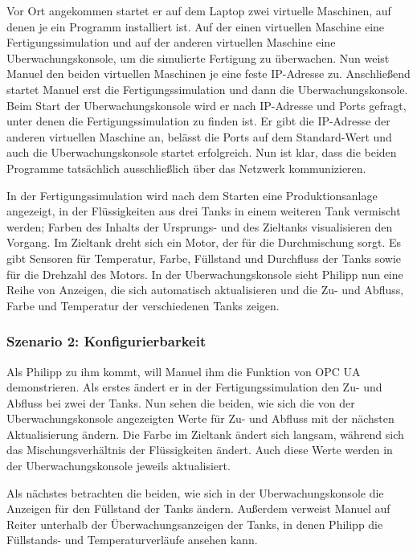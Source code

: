 \documentclass[parskip=full]{scrartcl}
\begin{document}
Vor Ort angekommen startet er auf dem Laptop zwei virtuelle Maschinen, auf denen je ein Programm installiert ist.
Auf der einen virtuellen Maschine eine \gls{Fertigungssimulation} und auf der anderen virtuellen Maschine
eine \gls{Uberwachungskonsole}, um die simulierte Fertigung zu überwachen.
Nun weist Manuel den beiden virtuellen Maschinen je eine feste IP-Adresse zu.
Anschlie{\ss}end startet Manuel erst die \gls{Fertigungssimulation} und dann die \gls{Uberwachungskonsole}.
Beim Start der \gls{Uberwachungskonsole} wird er nach \gls{IP-Adresse} und Ports gefragt, unter denen die \gls{Fertigungssimulation} zu finden ist.
Er gibt die \gls{IP-Adresse} der anderen virtuellen Maschine an, belässt die Ports auf dem Standard-Wert
und auch die \gls{Uberwachungskonsole} startet erfolgreich.
Nun ist klar, dass die beiden Programme tatsächlich ausschließlich über das Netzwerk kommunizieren.

In der \gls{Fertigungssimulation} wird nach dem Starten eine \gls{Produktionsanlage} angezeigt, in der Flüssigkeiten aus drei Tanks
in einem weiteren Tank vermischt werden; Farben des Inhalts der Ursprungs- und des Zieltanks visualisieren den Vorgang.
Im Zieltank dreht sich ein Motor, der für die Durchmischung sorgt.
Es gibt Sensoren für Temperatur, Farbe, Füllstand und Durchfluss der Tanks sowie für die Drehzahl des Motors.
In der \gls{Uberwachungskonsole} sieht Philipp nun eine Reihe von Anzeigen, die sich automatisch aktualisieren und
die Zu- und Abfluss, Farbe und Temperatur der verschiedenen Tanks zeigen.

\subsubsection{Szenario 2: Konfigurierbarkeit}
Als Philipp zu ihm kommt, will Manuel ihm die Funktion von \gls{OPC UA} demonstrieren.
Als erstes ändert er in der \gls{Fertigungssimulation} den Zu- und Abfluss bei zwei der Tanks. Nun sehen die beiden, wie
sich die von der \gls{Uberwachungskonsole} angezeigten Werte für Zu- und Abfluss mit der nächsten Aktualisierung ändern. Die
Farbe im Zieltank ändert sich langsam, während sich das Mischungsverhältnis der Flüssigkeiten ändert. Auch diese
Werte werden in der \gls{Uberwachungskonsole} jeweils aktualisiert.

Als nächstes betrachten die beiden, wie sich in der \gls{Uberwachungskonsole} die Anzeigen für den Füllstand der Tanks ändern.
Außerdem verweist Manuel auf Reiter unterhalb der Überwachungsanzeigen der Tanks,
in denen Philipp die Füllstands- und Temperaturverläufe ansehen kann.
\end{document}
